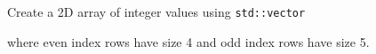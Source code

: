 Create a 2D array of integer values using \texttt{std::vector}

where even index rows have size 4 and odd index rows have size 5.

